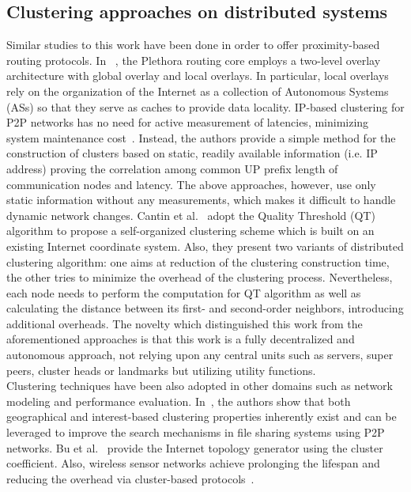 \subsection{Clustering approaches on distributed systems}
\label{solare:clustering}
Similar studies to this work have been done in order to offer
proximity-based routing protocols.
%
In~\cite{locality} , the Plethora routing core employs a two-level overlay architecture
with global overlay and local overlays.
%
In particular, local overlays rely on the organization of the Internet
as a collection of Autonomous Systems (ASs) so that they serve as caches
to provide data locality.
%
IP-based clustering for P2P networks has no need for active measurement
of latencies, minimizing system maintenance cost~\cite{ipclustering}.
%
Instead, the authors provide a simple method for the construction of
clusters based on static, readily available information (i.e. IP
address) proving the correlation among common UP prefix length of
communication nodes and latency.
%
The above approaches, however, use only static information without any
measurements, which makes it difficult to handle dynamic network
changes.
%
Cantin et al.~\cite{cantin} adopt the Quality Threshold (QT) algorithm to propose a
self-organized clustering scheme which is built on an existing Internet
coordinate system.
%
Also, they present two variants of distributed clustering algorithm: one
aims at reduction of the clustering construction time, the other tries
to minimize the overhead of the clustering process.
%
Nevertheless, each node needs to perform the computation for QT
algorithm as well as calculating the distance between its first- and
second-order neighbors, introducing additional overheads.
%
The novelty which distinguished this work from the aforementioned
approaches is that this work is a fully decentralized and autonomous
approach, not relying upon any central units such as servers, super
peers, cluster heads or landmarks but utilizing utility functions.\\
%
Clustering techniques have been also adopted in other domains such as
network modeling and performance evaluation.
%
In~\cite{filesharing}, the authors show that both geographical and interest-based
clustering properties inherently exist and can be leveraged to improve
the search mechanisms in file sharing systems using P2P networks.
%
Bu et al.~\cite{bu} provide the Internet topology generator using the cluster
coefficient.
%
Also, wireless sensor networks achieve prolonging the lifespan and
reducing the overhead via cluster-based protocols~\cite{clusterrouting,
energyintra, cao}.
%

